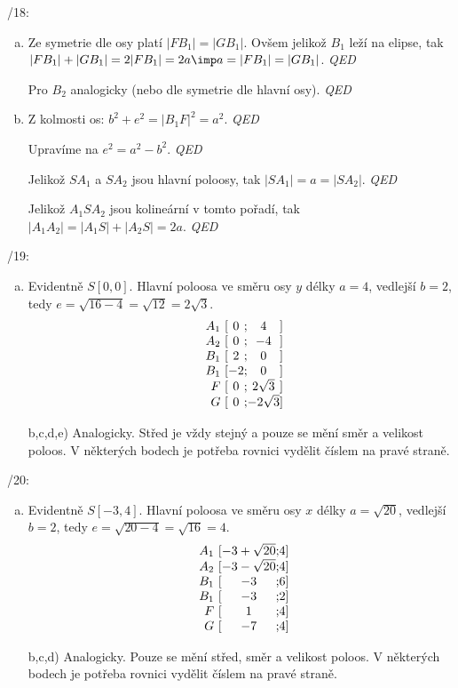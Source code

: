 /18:
\begin{enumerate}[a)]
	\item Ze symetrie dle osy platí $|FB_1| = |GB_1|$.
		Ovšem jelikož $B_1$ leží na elipse, tak $|FB_1| + |GB_1| = 2|FB_1| =2a \imp a = |FB_1| = |GB_1|$. \emph{QED}

		Pro $B_2$ analogicky (nebo dle symetrie dle hlavní osy). \emph{QED}

	\item Z kolmosti os: $b^2 + e^2 = |B_1F|^2 = a^2$. \emph{QED}

		Upravíme na $e^2= a^2 - b^2$. \emph{QED}

		Jelikož $SA_1$ a $SA_2$ jsou hlavní poloosy, tak $|SA_1|=a=|SA_2|$. \emph{QED}

		Jelikož $A_1SA_2$ jsou kolineární v tomto pořadí, tak $|A_1A_2| = |A_1S| + |A_2S| = 2a$. \emph{QED}

\end{enumerate}
/19:
\begin{enumerate}[a)]
	\item
		Evidentně $S[0,0]$.
		Hlavní poloosa ve směru osy $y$ délky $a = 4$, vedlejší $b = 2$, tedy $e = \sqrt{16 - 4} = \sqrt{12}  =  2 \sqrt 3$.
$$
\begin{array}{r@{\ [}c@{;}c@{]}}
	A_1 &  0 & 4\\
	A_2 &  0 & -4\\
	B_1 &  2 & 0 \\
	B_1 & -2 & 0 \\
	F   &  0 & 2\sqrt 3\\
	G   &  0 & -2\sqrt 3\\
\end{array}
$$
\item [b,c,d,e)] Analogicky. Střed je vždy stejný a pouze se mění směr a velikost poloos.
	V některých bodech je potřeba rovnici vydělit číslem na pravé straně.
\end{enumerate}

/20:
\begin{enumerate}[a)]
	\item
		Evidentně $S[-3,4]$.
		Hlavní poloosa ve směru osy $x$ délky $a = \sqrt{20}$, vedlejší $b = 2$, tedy $e = \sqrt{20 - 4} = \sqrt{16}  =  4$.
$$
\begin{array}{r@{\ [}c@{;}c@{]}}
	A_1 &  -3+\sqrt{20} & 4\\
	A_2 &  -3-\sqrt{20} & 4\\
	B_1 &  -3 & 6 \\
	B_1 &  -3 & 2 \\
	F   &  1 & 4\\
	G   &  -7 & 4\\
\end{array}
$$
\item [b,c,d)] Analogicky. Pouze se mění střed, směr a velikost poloos. 
	V některých bodech je potřeba rovnici vydělit číslem na pravé straně.
\end{enumerate}

